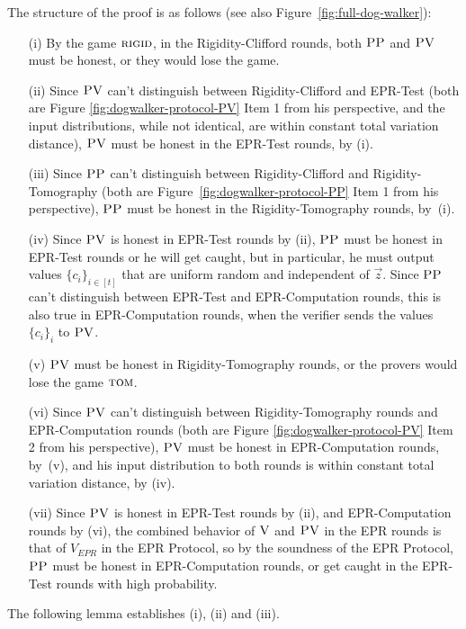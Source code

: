 



\noindent The structure of the proof is as follows (see also Figure~\ref{fig:full-dog-walker}):
\begin{enumerate}
\item[(i)] By the game $\textsc{rigid}$, in the Rigidity-Clifford rounds, both $\textsc{PP}$ and $\textsc{PV}$ must be honest, or they would lose the game.
\item[(ii)] Since $\textsc{PV}$ can't distinguish between Rigidity-Clifford and EPR-Test (both are Figure \ref{fig:dogwalker-protocol-PV} Item 1 from his perspective, and the input distributions, while not identical, are within constant total variation distance), $\textsc{PV}$ must be honest in the EPR-Test rounds, by (i). 
\item[(iii)] Since $\textsc{PP}$ can't distinguish between Rigidity-Clifford and Rigidity-Tomography (both are Figure~\ref{fig:dogwalker-protocol-PP} Item 1 from his perspective), $\textsc{PP}$ must be honest in the Rigidity-Tomography rounds, by~(i). 
\item[(iv)] Since $\textsc{PV}$ is honest in EPR-Test rounds by (ii), $\textsc{PP}$ must be honest in EPR-Test rounds or he will get caught, but in particular, he must output values $\{c_i\}_{i\in [t]}$ that are uniform random and independent of $\vec{z}$. Since $\textsc{PP}$ can't distinguish between EPR-Test and EPR-Computation rounds, this is also true in EPR-Computation rounds, when the verifier sends the values $\{c_i\}_i$ to $\textsc{PV}$. 
\item[(v)] $\textsc{PV}$ must be honest in Rigidity-Tomography rounds, or the provers would lose the game $\textsc{tom}$.
\item[(vi)] Since $\textsc{PV}$ can't distinguish between Rigidity-Tomography rounds and EPR-Computation rounds (both are Figure \ref{fig:dogwalker-protocol-PV} Item 2 from his perspective), $\textsc{PV}$ must be honest in EPR-Computation rounds, by~(v), and his input distribution to both rounds is within constant total variation distance, by (iv).
\item[(vii)] Since $\textsc{PV}$ is honest in EPR-Test rounds by (ii), and EPR-Computation rounds by (vi), the combined behavior of $\textsc{V}$ and $\textsc{PV}$ in the EPR rounds is that of $V_{EPR}$ in the EPR Protocol, so
by the soundness of the EPR Protocol, $\textsc{PP}$ must be honest in EPR-Computation rounds, or get caught in the EPR-Test rounds with high probability.
\end{enumerate}

 The following lemma establishes (i), (ii) and (iii). 

